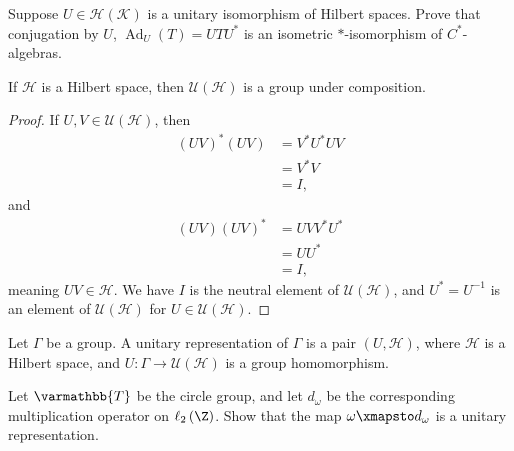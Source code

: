 \documentclass[10pt]{mypackage}
\renewcommand*{\mathbb}[1]{\varmathbb{#1}}
\begin{document}
\begin{exercise}
  Suppose $U\in \mathcal{H}\left(\mathcal{K}\right)$ is a unitary isomorphism of Hilbert spaces. Prove that conjugation by $U$, $\operatorname{Ad}_{U}\left(T\right) = UTU^{\ast}$ is an isometric $\ast$-isomorphism of $C^{\ast}$-algebras.
\end{exercise}
\begin{fact}
If $\mathcal{H}$ is a Hilbert space, then $\mathcal{U}\left(\mathcal{H}\right)$ is a group under composition.
\end{fact}
\begin{proof}
  If $U,V\in \mathcal{U}\left(\mathcal{H}\right)$, then
  \begin{align*}
    \left(UV\right)^{\ast}\left(UV\right) &= V^{\ast}U^{\ast}UV\\
                                          &= V^{\ast}V\\
                                          &= I,
  \end{align*}
  and
  \begin{align*}
    \left(UV\right)\left(UV\right)^{\ast} &= UVV^{\ast}U^{\ast}\\
                                          &= UU^{\ast}\\
                                          &= I,
  \end{align*}
  meaning $UV\in \mathcal{H}$. We have $I$ is the neutral element of $\mathcal{U}\left(\mathcal{H}\right)$, and $U^{\ast} = U^{-1}$ is an element of $\mathcal{U}\left(\mathcal{H}\right)$ for $U\in \mathcal{U}\left(\mathcal{H}\right)$.
\end{proof}
\begin{definition}
  Let $\Gamma$ be a group. A unitary representation of $\Gamma$ is a pair $\left(U,\mathcal{H}\right)$, where $\mathcal{H}$ is a Hilbert space, and $U: \Gamma \rightarrow \mathcal{U}\left(\mathcal{H}\right)$ is a group homomorphism.
\end{definition}
\begin{exercise}
  Let $\mathbb{T}$ be the circle group, and let $d_{\omega}$ be the corresponding multiplication operator on $\ell_{2}\left(\Z\right)$. Show that the map $\omega \xmapsto d_{\omega}$ is a unitary representation.
\end{exercise}
\end{document}
